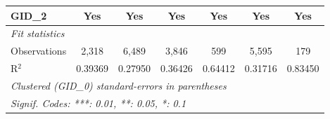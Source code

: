 \begin{table}[H]
\begin{tabular}{lcccccc}
      GID\_2                             & Yes      & Yes           & Yes            & Yes          & Yes      & Yes\\  
      \midrule
      \emph{Fit statistics}\\
      Observations                       & 2,318    & 6,489         & 3,846          & 599          & 5,595    & 179\\  
      R$^2$                              & 0.39369  & 0.27950       & 0.36426        & 0.64412      & 0.31716  & 0.83450\\  
      \midrule \midrule
      \multicolumn{7}{l}{\emph{Clustered (GID\_0) standard-errors in parentheses}}\\
      \multicolumn{7}{l}{\emph{Signif. Codes: ***: 0.01, **: 0.05, *: 0.1}}\\
   \end{tabular}
\end{table}



